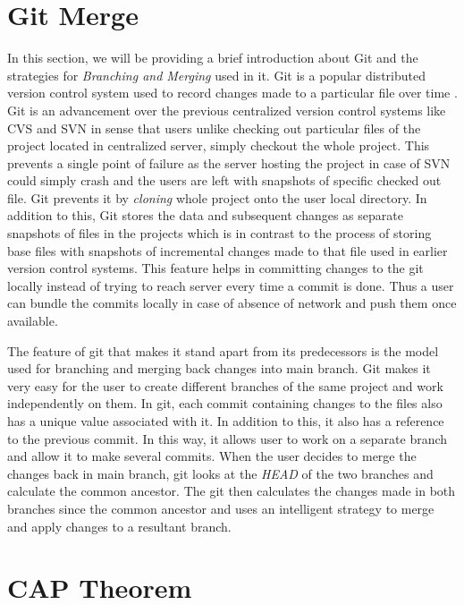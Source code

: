 \documentclass[a4paper,11pt]{kth-mag}
\begin{document}
\section{Git Merge}
In this section, we will be providing a brief introduction about Git and the strategies for \textit{Branching and Merging} \cite{gitmerge} used in it. Git is a popular distributed version control system used to record changes made to a particular file over time \cite{gitVersionControl}. Git is an advancement over the previous centralized version control systems like CVS \cite{cvs} and SVN \cite{svn} in sense that users unlike checking out particular files of the project located in centralized server, simply checkout the whole project. This prevents a single point of failure as the server hosting the project in case of SVN could simply crash and the users are left with snapshots of specific checked out file. Git prevents it by \textit{cloning} whole project onto the user local directory. In addition to this, Git stores the data and subsequent changes as separate snapshots of files in the projects which is in contrast to the process of storing base files with snapshots of incremental changes made to that file used in earlier version control systems. This feature helps in committing changes to the git locally instead of trying to reach server every time a commit is done. Thus a user can bundle the commits locally in case of absence of network and push them once available.
\par The feature of git that makes it stand apart from its predecessors is the model used for branching and merging back changes into main branch. Git makes it very easy for the user to create different branches of the same project and work independently on them. In git, each commit containing changes to the files also has a unique value associated with it. In addition to this, it also has a reference to the previous commit. In this way, it allows user to work on a separate branch and allow it to make several commits. When the user decides to merge the changes back in main branch, git looks at the \textit{HEAD} of the two branches and calculate the common ancestor. The git then calculates the changes made in both branches since the common ancestor and uses an intelligent strategy to merge and apply changes to a resultant branch.


\section{CAP Theorem}
\end{document}
